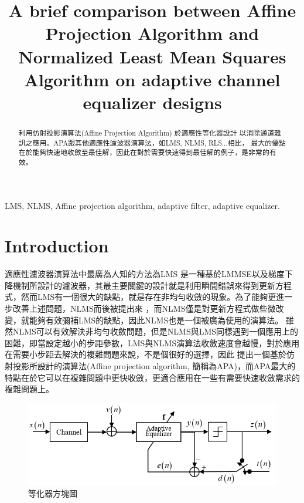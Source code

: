 \documentclass[conference]{IEEEtran}
\begin{document}
    \title{ %
    A brief comparison between Affine Projection Algorithm and Normalized Least Mean Squares Algorithm on adaptive channel equalizer designs}
    \author{
    }
    \maketitle
    \begin{abstract}
        利用仿射投影演算法(Affine Projection Algorithm) 於適應性等化器設計
        以消除通道雜訊之應用。APA跟其他適應性濾波器演算法，如LMS, NLMS, RLS...相比，
        最大的優點在於能夠快速地收斂至最佳解，因此在對於需要快速得到最佳解的例子，是非常的有效。
    \end{abstract}
    \begin{IEEEkeywords}
        LMS, NLMS, Affine projection algorithm, adaptive filter, adaptive equalizer. 
    \end{IEEEkeywords}
    \IEEEpeerreviewmaketitle
    
    \section{Introduction}\label{sec_intro}
    適應性濾波器演算法中最廣為人知的方法為LMS \cite{widrow1960adaptive}是一種基於LMMSE以及梯度下降機制所設計的濾波器，其最主要關鍵的設計就是利用瞬間錯誤來得到更新方程式，然而LMS有一個很大的缺點，就是存在非均勻收斂的現象。為了能夠更進一步改善上述問題，NLMS而後被提出來 \cite{Hsia1983convergence}，而NLMS僅是對更新方程式做些微改變，就能夠有效彌補LMS的缺點，因此NLMS也是一個被廣為使用的演算法。
    雖然NLMS可以有效解決非均勻收斂問題，但是NLMS與LMS同樣遇到一個應用上的困難，即當設定越小的步距參數，LMS與NLMS演算法收斂速度會越慢，對於應用在需要小步距去解決的複雜問題來說，不是個很好的選擇，因此 \cite{Ozeki1984An}\cite{Ozeki2016Theory}提出一個基於仿射投影所設計的演算法(Affine projection algorithm, 簡稱為APA)，而APA最大的特點在於它可以在複雜問題中更快收斂，更適合應用在一些有需要快速收斂需求的複雜問題上。
    \begin{figure}[hb]
        \centering
        \includegraphics[width={0.9\linewidth}]{Figure/system_model.png}
        \caption{等化器方塊圖}
        \label{fig:等化器方塊圖}
        \vspace{-0.25cm}
    \end{figure}
    
\end{document}
